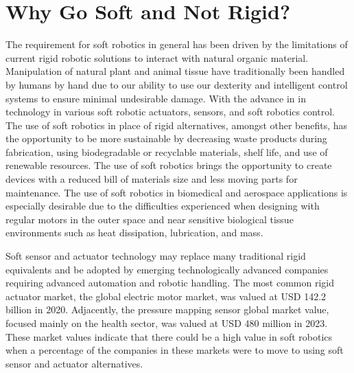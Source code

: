 \section{Why Go Soft and Not Rigid?}
The requirement for soft robotics in general has been driven by the limitations of current rigid robotic solutions to interact with natural organic material. Manipulation of natural plant and animal tissue have traditionally been handled by humans by hand due to our ability to use our dexterity and intelligent control systems to ensure minimal undesirable damage. With the advance in in technology in various soft robotic actuators\cite{Stella2023,Zhang2023,Hartmann2021,Yasa2023, Manti2016}, sensors\cite{Hegde2023}, and soft robotics control\cite{DellaSantina2023, Armanini2023}. The use of soft robotics in place of rigid alternatives, amongst other benefits, has the opportunity to be more sustainable by decreasing waste products during fabrication, using biodegradable or recyclable materials, shelf life, and use of renewable resources\cite{Hartmann2021}. The use of soft robotics brings the opportunity to create devices with a reduced bill of materials size and less moving parts for maintenance. The use of soft robotics in biomedical and aerospace applications is especially desirable due to the difficulties experienced when designing with regular motors in the outer space and near sensitive biological tissue environments such as heat dissipation, lubrication, and mass\cite{Murugesan1981,Ashuri2020,Branz2017,Bruschi2021}. 

Soft sensor and actuator technology may replace many traditional rigid equivalents and be adopted by emerging technologically advanced companies requiring advanced automation and robotic handling. The most common rigid actuator market, the global electric motor market, was valued at USD 142.2 billion in 2020\cite{alliedmarketresearch}. Adjacently, the pressure mapping sensor global market value, focused mainly on the health sector, was valued at USD 480 million in 2023\cite{Bharatha2023}. These market values indicate that there could be a high value in soft robotics when a percentage of the companies in these markets were to move to using soft sensor and actuator alternatives.


